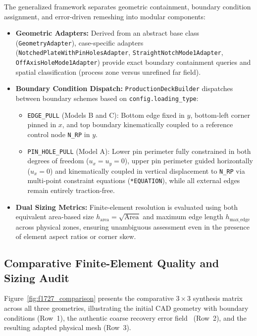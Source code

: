 The generalized framework separates geometric containment, boundary condition assignment, and error-driven remeshing into modular components:
\begin{itemize}
  \item \textbf{Geometric Adapters:} Derived from an abstract base class (\texttt{GeometryAdapter}), case-specific adapters (\texttt{NotchedPlateWithPinHolesAdapter}, \texttt{StraightNotchMode1Adapter}, \texttt{OffAxisHoleMode1Adapter}) provide exact boundary containment queries and spatial classification (process zone versus unrefined far field).
  \item \textbf{Boundary Condition Dispatch:} \texttt{ProductionDeckBuilder} dispatches between boundary schemes based on \texttt{config.loading\_type}:
  \begin{itemize}
    \item \texttt{EDGE\_PULL} (Models B and C): Bottom edge fixed in $y$, bottom-left corner pinned in $x$, and top boundary kinematically coupled to a reference control node \texttt{N\_RP} in $y$.
    \item \texttt{PIN\_HOLE\_PULL} (Model A): Lower pin perimeter fully constrained in both degrees of freedom ($u_x = u_y = 0$), upper pin perimeter guided horizontally ($u_x = 0$) and kinematically coupled in vertical displacement to \texttt{N\_RP} via multi-point constraint equations (\texttt{*EQUATION}), while all external edges remain entirely traction-free.
  \end{itemize}
  \item \textbf{Dual Sizing Metrics:} Finite-element resolution is evaluated using both equivalent area-based size $h_{\mathrm{area}} = \sqrt{\mathrm{Area}}$ and maximum edge length $h_{\mathrm{max\_edge}}$ across physical zones, ensuring unambiguous assessment even in the presence of element aspect ratios or corner skew.
\end{itemize}

\subsection{Comparative Finite-Element Quality and Sizing Audit}
\label{subsec:f1727_audit}

Figure~\ref{fig:f1727_comparison} presents the comparative $3 \times 3$ synthesis matrix across all three geometries, illustrating the initial CAD geometry with boundary conditions (Row~1), the authentic coarse recovery error field \MISESERI\ (Row~2), and the resulting adapted physical mesh (Row~3).

